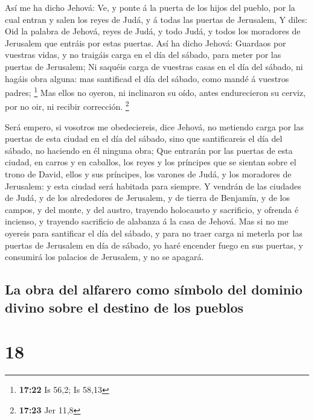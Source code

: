  Así me ha dicho Jehová: Ve, y ponte á la puerta de los
hijos del pueblo, por la cual entran y salen los reyes de Judá, y á
todas las puertas de Jerusalem,  Y diles: Oid la palabra de
Jehová, reyes de Judá, y todo Judá, y todos los moradores de Jerusalem
que entráis por estas puertas.  Así ha dicho Jehová:
Guardaos por vuestras vidas, y no traigáis carga en el día del sábado,
para meter por las puertas de Jerusalem;  Ni saquéis carga
de vuestras casas en el día del sábado, ni hagáis obra alguna: mas
santificad el día del sábado, como mandé á vuestros padres; \footnote{\textbf{17:22}
  Is 56,2; Is 58,13}  Mas ellos no oyeron, ni inclinaron su
oído, antes endurecieron su cerviz, por no oir, ni recibir corrección.
\footnote{\textbf{17:23} Jer 11,8}

 Será empero, si vosotros me obedeciereis, dice Jehová, no
metiendo carga por las puertas de esta ciudad en el día del sábado, sino
que santificareis el día del sábado, no haciendo en él ninguna obra;
 Que entrarán por las puertas de esta ciudad, en carros y
en caballos, los reyes y los príncipes que se sientan sobre el trono de
David, ellos y sus príncipes, los varones de Judá, y los moradores de
Jerusalem: y esta ciudad será habitada para siempre.  Y
vendrán de las ciudades de Judá, y de los alrededores de Jerusalem, y de
tierra de Benjamín, y de los campos, y del monte, y del austro, trayendo
holocausto y sacrificio, y ofrenda é incienso, y trayendo sacrificio de
alabanza á la casa de Jehová.  Mas si no me oyereis para
santificar el día del sábado, y para no traer carga ni meterla por las
puertas de Jerusalem en día de sábado, yo haré encender fuego en sus
puertas, y consumirá los palacios de Jerusalem, y no se apagará.

\hypertarget{la-obra-del-alfarero-como-suxedmbolo-del-dominio-divino-sobre-el-destino-de-los-pueblos}{%
\subsection{La obra del alfarero como símbolo del dominio divino sobre
el destino de los
pueblos}\label{la-obra-del-alfarero-como-suxedmbolo-del-dominio-divino-sobre-el-destino-de-los-pueblos}}

\hypertarget{section-17}{%
\section{18}\label{section-17}}

